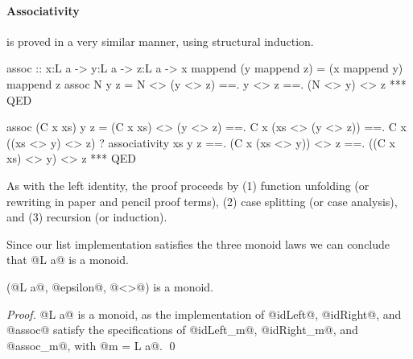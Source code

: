 \paragraph{Associativity} is proved in a very similar manner,
using structural induction.
%
\begin{code}
assoc   :: x:L a -> y:L a -> z:L a
        -> { x mappend (y mappend z) = (x mappend y) mappend z}
assoc N y z
  =   N <> (y <> z)
  ==. y <> z
  ==. (N <> y) <> z
  *** QED

assoc (C x xs) y z
  =  (C x xs) <> (y <> z)
  ==. C x (xs <> (y <> z))
  ==. C x ((xs <> y) <> z) ? associativity xs y z
  ==. (C x (xs <> y)) <> z
  ==. ((C x xs) <> y) <> z
  *** QED
 \end{code}
%
As with the left identity, the proof proceeds by
(1) function unfolding (or rewriting in paper and pencil proof terms),
(2) case splitting (or case analysis), and
(3) recursion (or induction).

Since our list implementation satisfies the three monoid laws
we can conclude that @L a@ is a monoid.
%


\begin{theorem}\label{theorem:monoid:list}
(@L a@, @epsilon@, @<>@) is a monoid.
\end{theorem}
\begin{proof}
@L a@ is a monoid, as the implementation of
@idLeft@, @idRight@, and @assoc@
satisfy the specifications of
@idLeft_m@, @idRight_m@, and @assoc_m@, with @m = L a@.
\qed\end{proof}
